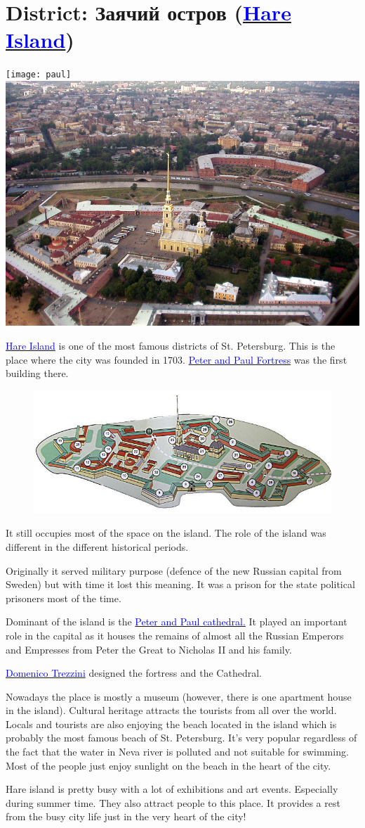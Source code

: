 \documentclass[a4paper]{article}
\newcommand{\myhref}[2]{{\href{#1}{\textcolor{blue}{#2}}}}
\begin{document}
\section{District: Заячий остров (\myhref{http://goo.gl/maps/KJ6t2}{Hare Island})}

\texttt{[image: paul]}\hspace{.2cm}\includegraphics[keepaspectratio,width=.48\textwidth]{paul2}

\myhref{http://en.wikipedia.org/wiki/Zayachy_Island}{Hare Island} is one of the most famous districts of St. Petersburg. This is the place where the city was founded
in 1703. \myhref{http://en.wikipedia.org/wiki/Peter_and_Paul_fortress}{Peter and Paul Fortress} was the first building there.\\
\begin{figure}
\includegraphics[keepaspectratio,width=.48\textwidth]{planpetr}
\end{figure}
It still occupies most of the space on the island. The role of the island was different in the different historical periods.

Originally it served military purpose (defence of the new Russian capital from Sweden) but with time it lost this meaning. It was a prison for the state
political prisoners most of the time. 

Dominant of the island is the \myhref{http://en.wikipedia.org/wiki/Peter_and_Paul_Cathedral}{Peter and Paul cathedral.} It played an important role in the
capital as it houses the remains of almost all the Russian Emperors and Empresses from Peter the Great to Nicholas II and his family.

\myhref{http://en.wikipedia.org/wiki/Domenico_Trezzini}{Domenico Trezzini} designed the fortress and the Cathedral.

Nowadays the place is mostly a museum (however, there is one apartment house in the island). Cultural heritage attracts the tourists from all over the world.
Locals and tourists are also enjoying the beach located in the island which is probably the most famous beach of St. Petersburg. It's very popular regardless
of the fact that the water in Neva river is polluted and not suitable for swimming. Most of the people just enjoy sunlight on the beach in the heart of the city.

Hare island is pretty busy with a lot of exhibitions and art events. Especially during summer time. They also attract people to this place. It provides a rest from the
busy city life just in the very heart of the city!
\end{document}
